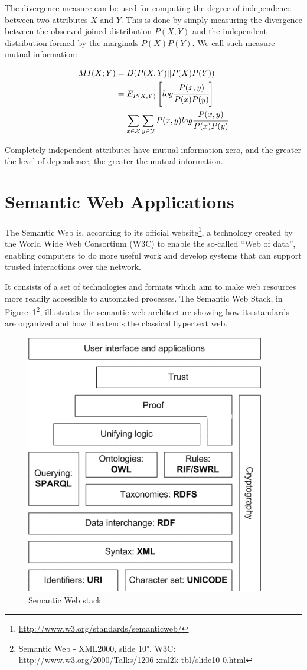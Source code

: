 The divergence measure can be used for computing the degree of independence between two attributes $X$ and $Y$. This
is
done by simply measuring the divergence between the observed joined distribution $P(X,Y)$ and the independent
distribution formed by the marginals $P(X)P(Y)$. We call such measure mutual information:

\begin{equation} \label{eq:mutualInformation}
\begin{split}
 MI(X;Y)&=D(P(X,Y)||P(X)P(Y)) \\
 &=E_{P(X,Y)}\left[ log\cfrac{P(x,y)}{P(x)P(y)} \right] \\
 &=\sum_{x \in \mathcal{X}} \sum_{y \in \mathcal{Y}} P(x,y)log\cfrac{P(x,y)}{P(x)P(y)}
\end{split}
\end{equation}

Completely independent attributes have mutual information zero, and the greater the level of dependence, the greater
the mutual information.

\section{Semantic Web Applications}
\label{sec:rw-semanticWeb}

The Semantic Web is, according to its official website\footnote{\url{http://www.w3.org/standards/semanticweb/}}, a
technology created by the World Wide Web Consortium (W3C) to enable the so-called ``Web of data'', enabling computers
to do more useful work and develop systems that can support trusted interactions over the network. 

It consists of a set of technologies and formats which aim to make web resources more readily accessible to automated
processes. The Semantic Web Stack, in Figure~\ref{fig:sematicWebLayer}\footnote{Semantic Web - XML2000, slide 10".
W3C: \url{http://www.w3.org/2000/Talks/1206-xml2k-tbl/slide10-0.html}}, illustrates the semantic web architecture
showing how its standards are organized and how it extends the classical hypertext web.

\begin{figure}
\begin{center}
  \includegraphics[width=0.5\linewidth]{./Figures/Semantic-web-stack.png}
\end{center}
\caption{Semantic Web stack}
\label{fig:sematicWebLayer}
\end{figure}

